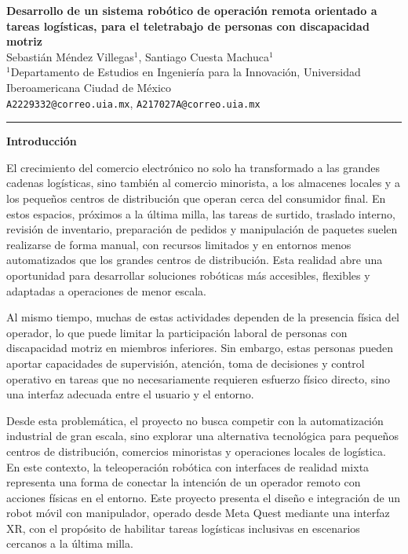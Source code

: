\documentclass[12pt,letterpaper]{article}
\begin{document}
\begin{center}
\textbf{Desarrollo de un sistema robótico de operación remota orientado a tareas logísticas, para el teletrabajo de personas con discapacidad motriz}\\[2pt]
Sebastián Méndez Villegas$^{1}$, Santiago Cuesta Machuca$^{1}$\\[1pt]
$^{1}$Departamento de Estudios en Ingeniería para la Innovación, Universidad Iberoamericana Ciudad de México\\[1pt]
\texttt{A2229332@correo.uia.mx}, \texttt{A217027A@correo.uia.mx}
\end{center}

\begin{center}\rule{0.55\textwidth}{0.4pt}\end{center}

\textbf{Introducción}

El crecimiento del comercio electrónico no solo ha transformado a las grandes cadenas logísticas, sino también al comercio minorista, a los almacenes locales y a los pequeños centros de distribución que operan cerca del consumidor final. En estos espacios, próximos a la última milla, las tareas de surtido, traslado interno, revisión de inventario, preparación de pedidos y manipulación de paquetes suelen realizarse de forma manual, con recursos limitados y en entornos menos automatizados que los grandes centros de distribución. Esta realidad abre una oportunidad para desarrollar soluciones robóticas más accesibles, flexibles y adaptadas a operaciones de menor escala.

Al mismo tiempo, muchas de estas actividades dependen de la presencia física del operador, lo que puede limitar la participación laboral de personas con discapacidad motriz en miembros inferiores. Sin embargo, estas personas pueden aportar capacidades de supervisión, atención, toma de decisiones y control operativo en tareas que no necesariamente requieren esfuerzo físico directo, sino una interfaz adecuada entre el usuario y el entorno.

Desde esta problemática, el proyecto no busca competir con la automatización industrial de gran escala, sino explorar una alternativa tecnológica para pequeños centros de distribución, comercios minoristas y operaciones locales de logística. En este contexto, la teleoperación robótica con interfaces de realidad mixta representa una forma de conectar la intención de un operador remoto con acciones físicas en el entorno. Este proyecto presenta el diseño e integración de un robot móvil con manipulador, operado desde Meta Quest mediante una interfaz XR, con el propósito de habilitar tareas logísticas inclusivas en escenarios cercanos a la última milla.
\end{document}
